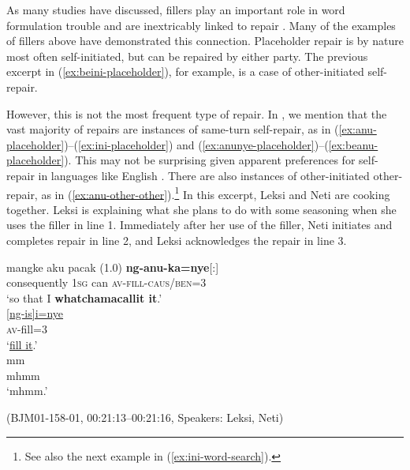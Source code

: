 \documentclass[output=paper,
\ChapterDOI{10.5281/zenodo.15697583}
colorlinks,
citecolor=brown]{langscibook}
\begin{document}


As many studies have discussed, fillers play an important role in word formulation trouble and are inextricably linked to repair \parencite[see, e.g.,][]{wouk2005syntax}. Many of the examples of fillers above have demonstrated this connection. Placeholder repair is by nature most often self-initiated, but can be repaired by either party. The previous excerpt in (\ref{ex:beini-placeholder}), for example, is a case of other-initiated self-repair.

However, this is not the most frequent type of repair. In , we mention that the vast majority of repairs are instances of same-turn self-repair, as in (\ref{ex:anu-placeholder})--(\ref{ex:ini-placeholder}) and (\ref{ex:anunye-placeholder})--(\ref{ex:beanu-placeholder}). This may not be surprising given apparent preferences for self-repair in languages like English \citep{schegloff1977preference}. There are also instances of other-initiated other-repair, as in (\ref{ex:anu-other-other}).\footnote{See also the next example in (\ref{ex:ini-word-search}).} In this excerpt, Leksi and Neti are cooking together. Leksi is explaining what she plans to do with some seasoning when she uses the filler in line 1. Immediately after her use of the filler, Neti initiates and completes repair in line 2, and Leksi acknowledges the repair in line 3.

\begin{exe}
\ex\label{ex:anu-other-other}
\begin{xlist}[0\quad →A:]
\gll mangke aku pacak (1.0) \textbf{ng-anu-ka=nye}[:]\\
consequently 1\textsc{sg} can {} \textsc{av-fill-caus/ben=3}\\
\glt `so that I \textbf{whatchamacallit it}.' \\
\gll \uline{[ng-is]i=nye}\\
\textsc{av}-fill=3\\
\glt `\uline{fill it}.' \\
\gll  mm\\
 mhmm\\ 
\glt `mhmm.' \\
\end{xlist}
\hfill (BJM01-158-01, 00:21:13--00:21:16, Speakers: Leksi, Neti)
\end{exe}
\end{document}

